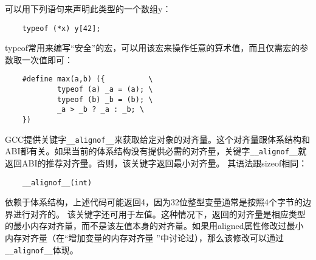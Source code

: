 可以用下列语句来声明此类型的一个数组y：
\begin{lstlisting}
    typeof (*x) y[42];
\end{lstlisting}

typeof常用来编写“安全”的宏，可以用该宏来操作任意的算术值，而且仅需宏的参数取一次值即可：
\begin{lstlisting}
    #define max(a,b) ({          \
            typeof (a) _a = (a); \
            typeof (b) _b = (b); \
            _a > _b ? _a : _b; \
    })    
\end{lstlisting}
\BiSection{获取类型的内存对齐量}{}
GCC提供关键字\verb+__alignof__+来获取给定对象的对齐量。这个对齐量跟体系结构和ABI都有关。如果当前的体系结构没有提供必需的对齐量，关键字\verb+__alignof__+就返回ABI的推荐对齐量。否则，该关键字返回最小对齐量。
其语法跟sizeof相同：
\begin{lstlisting}
    __alignof__(int)
\end{lstlisting}
依赖于体系结构，上述代码可能返回4，因为32位整型变量通常是按照4个字节的边界进行对齐的。
该关键字还可用于左值。这种情况下，返回的对齐量是相应类型的最小内存对齐量，而不是该左值本身的对齐量。如果用aligned属性修改过最小内存对齐量（在“增加变量的内存对齐量 ”中讨论过），那么该修改可以通过\verb+__alignof__+体现。

